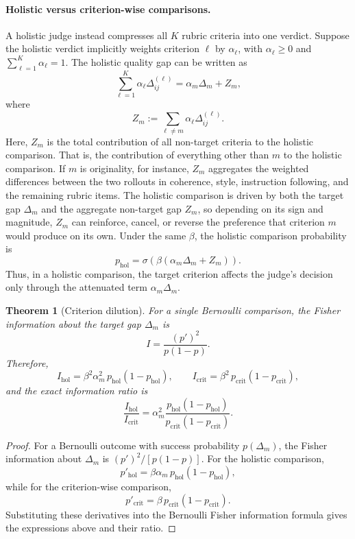 \documentclass{article}
\theoremstyle{plain}
\newtheorem{theorem}{Theorem}[section]
\theoremstyle{definition}
\theoremstyle{remark}
\begin{document}
\paragraph{Holistic versus criterion-wise comparisons.}
A holistic judge instead compresses all $K$ rubric criteria into one verdict. Suppose
the holistic verdict implicitly weights criterion $\ell$ by $\alpha_\ell$, with
$\alpha_\ell\ge 0$ and $\sum_{\ell=1}^K \alpha_\ell=1$. The holistic quality gap can be
written as
\[
\sum_{\ell=1}^K \alpha_\ell \Delta^{(\ell)}_{ij}
=
\alpha_m \Delta_m + Z_m,
\]
where
\[
Z_m
:=
\sum_{\ell\ne m} \alpha_\ell \Delta^{(\ell)}_{ij}.
\]
Here, $Z_m$ is the total contribution of all non-target criteria to the holistic comparison. That is, the contribution of everything other than $m$ to the holistic comparison. If $m$ is originality, for instance, $Z_m$ aggregates the weighted differences between the two rollouts in coherence, style, instruction following, and the remaining rubric items. The holistic comparison is driven by both the  target gap $\Delta_m$ and the aggregate non-target gap $Z_m$, so depending on its sign and magnitude, $Z_m$ can reinforce, cancel, or reverse the preference that criterion $m$ would produce on its own. Under the same $\beta$, the holistic comparison probability is
\[
p_{\mathrm{hol}}
=
\sigma\!\left(\beta(\alpha_m\Delta_m+Z_m)\right).
\]
Thus, in a holistic comparison, the target criterion affects the judge's decision only
through the attenuated term $\alpha_m\Delta_m$.

\begin{theorem}[Criterion dilution]
For a single Bernoulli comparison, the Fisher information about the target gap
$\Delta_m$ is
\[
I=\frac{(p')^2}{p(1-p)}.
\]
Therefore,
\[
I_{\mathrm{hol}}
=
\beta^2\alpha_m^2\,p_{\mathrm{hol}}(1-p_{\mathrm{hol}}),
\qquad
I_{\mathrm{crit}}
=
\beta^2\,p_{\mathrm{crit}}(1-p_{\mathrm{crit}}),
\]
and the exact information ratio is
\[
\frac{I_{\mathrm{hol}}}{I_{\mathrm{crit}}}
=
\alpha_m^2
\frac{p_{\mathrm{hol}}(1-p_{\mathrm{hol}})}
     {p_{\mathrm{crit}}(1-p_{\mathrm{crit}})}.
\]
\end{theorem}

\begin{proof}
For a Bernoulli outcome with success probability $p(\Delta_m)$, the Fisher information
about $\Delta_m$ is $(p')^2/[p(1-p)]$. For the holistic comparison,
\[
p'_{\mathrm{hol}}
=
\beta\alpha_m\,p_{\mathrm{hol}}(1-p_{\mathrm{hol}}),
\]
while for the criterion-wise comparison,
\[
p'_{\mathrm{crit}}
=
\beta\,p_{\mathrm{crit}}(1-p_{\mathrm{crit}}).
\]
Substituting these derivatives into the Bernoulli Fisher information formula gives the expressions above and their ratio.
\end{proof}
\end{document}
